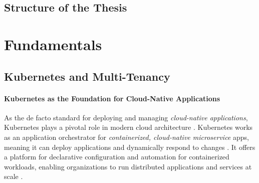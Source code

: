 \documentclass[11pt, a4paper, oneside, draft]{scrartcl}
\begin{document}
        \subsection{Structure of the Thesis}

    \section{Fundamentals}

        \subsection{Kubernetes and Multi-Tenancy}

            \paragraph{Kubernetes as the Foundation for Cloud-Native Applications}
                As the de facto standard for deploying and managing 
                \textit{cloud-native applications}, Kubernetes plays a pivotal role in modern cloud
                architecture \parencite[p.~7--8]{poulton2021}.
                Kubernetes works as an application orchestrator for \textit{containerized,
                cloud-native microservice} apps, meaning it can deploy applications and dynamically
                respond to changes \parencite[p.~3]{poulton2021}.
                It offers a platform for declarative configuration and automation for containerized
                workloads, enabling organizations to run distributed applications and services at
                scale \parencite{kubernetesOverview,redhatWhatIsKubernetes}.
\end{document}

